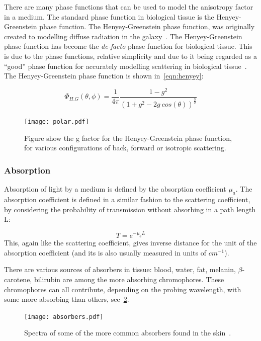 There are many phase functions that can be used to model the anisotropy factor in a medium. The standard phase function in biological tissue is the Henyey-Greenstein phase function. The Henyey-Greenstein phase function, was originally created to modelling diffuse radiation in the galaxy~\cite{lister2012optical,henyey1941diffuse}. The Henyey-Greenstein phase function has become the \textit{de-facto} phase function for biological tissue. This is due to the phase functions, relative simplicity and due to it being regarded as a ``good'' phase function for accurately modelling scattering in biological tissue~\cite{jacques1987angular}.
The Henyey-Greenstein phase function is shown in~\cref{eqn:henyey}:

\begin{equation}
	\Phi_{H.G}(\theta,\phi)=\frac{1}{4\pi}\frac{1-g^2}{(1+g^2-2g\ cos(\theta))^{\tfrac{3}{2}}}
	\label{eqn:henyey}
\end{equation}

\begin{figure}
	\centering
	\texttt{[image: polar.pdf]}
	\caption{Figure show the g factor for the Henyey-Greenstein phase function, for various configurations of back, forward or isotropic scattering.}
	\label{fig:henyey}
\end{figure}

\subsubsection*{Absorption}\label{sec:absor}

Absorption of light by a medium is defined by the absorption coefficient $\mu_a$. The absorption coefficient is defined in a similar fashion to the scattering coefficient, by considering the probability of transmission without absorbing in a path length L:

\begin{equation}
	T=e^{-\mu_aL}
\end{equation}
This, again like the scattering coefficient, gives inverse distance for the unit of the absorption coefficient (and its is also usually measured in units of $cm^{-1}$).

There are various sources of absorbers in tissue: blood, water, fat, melanin, $\beta$-carotene, bilirubin are among the more absorbing chromophores. These chromophores can all contribute, depending on the probing wavelength, with some more absorbing than others, see~\cref{fig:absorb}. 

\begin{figure}
	\centering
	\texttt{[image: absorbers.pdf]}
	\caption{Spectra of some of the more common absorbers found in the skin~\cite{dixon2005photochemcad,photoprahl2017,segelstein1981complex,pope1997absorption,jacques2013optical,van2004determination,saidi1992transcutaneous,iglesias2015biophysically,bashkatov2011optical,sarna2006physical}.}
	\label{fig:absorb}
\end{figure}


